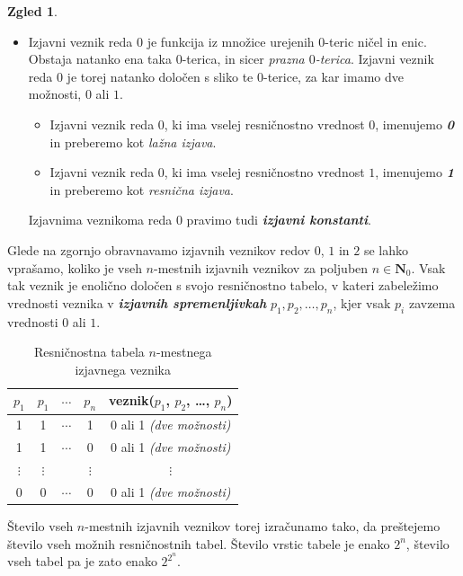 \documentclass[11pt]{book}
\def\NN{\mathbf{N}}
\def\definicija{\color{rdeca}\bf\em}
\theoremstyle{definition}
\theoremstyle{zgled}
\newtheorem*{zgled}{Zgled}
\theoremstyle{odprtproblem}
\theoremstyle{domacanaloga}
\theoremstyle{izrek}
\begin{document}
\begin{zgled}
\begin{itemize}
    \item Izjavni veznik reda $0$ je funkcija iz množice urejenih $0$-teric ničel in enic. Obstaja natanko ena taka $0$-terica, in sicer \emph{prazna $0$-terica}. Izjavni veznik reda $0$ je torej natanko določen s sliko te $0$-terice, za kar imamo dve možnosti, $0$ ali $1$.
    \begin{itemize}
        \item Izjavni veznik reda $0$, ki ima vselej resničnostno vrednost $0$, imenujemo {\definicija 0} in preberemo kot \emph{lažna izjava}.
        \item Izjavni veznik reda $0$, ki ima vselej resničnostno vrednost $1$, imenujemo {\definicija 1} in preberemo kot \emph{resnična izjava}.
    \end{itemize}
    Izjavnima veznikoma reda $0$ pravimo tudi {\definicija izjavni konstanti}.
\end{itemize}
\end{zgled}

Glede na zgornjo obravnavamo izjavnih veznikov redov $0$, $1$ in $2$ se lahko vprašamo, koliko je vseh $n$-mestnih izjavnih veznikov za poljuben $n \in \NN_0$. Vsak tak veznik je enolično določen s svojo resničnostno tabelo, v kateri zabeležimo vrednosti veznika v {\definicija izjavnih spremenljivkah} $p_1, p_2, \dots, p_n$, kjer vsak $p_i$ zavzema vrednosti $0$ ali $1$.

\begin{table}[h]
    \centering
    \begin{tabular}{cccc|c}
        $p_1$ & $p_1$ & $\cdots$ & $p_n$ & veznik($p_1$, $p_2$, \dots, $p_n$) \\ \hline
        1 & 1 & $\cdots$ & 1 & 0 ali 1 \emph{(dve možnosti)} \\
        1 & 1 & $\cdots$ & 0 & 0 ali 1 \emph{(dve možnosti)} \\
        $\vdots$ & $\vdots$ & & $\vdots$ & $\vdots$ \\
        0 & 0 & $\cdots$ & 0 & 0 ali 1 \emph{(dve možnosti)} \\
    \end{tabular}
    \caption{Resničnostna tabela $n$-mestnega izjavnega veznika}
\end{table}

Število vseh $n$-mestnih izjavnih veznikov torej izračunamo tako, da preštejemo število vseh možnih resničnostnih tabel. Število vrstic tabele je enako $2^n$, število vseh tabel pa je zato enako $2^{2^n}$.
\end{document}
